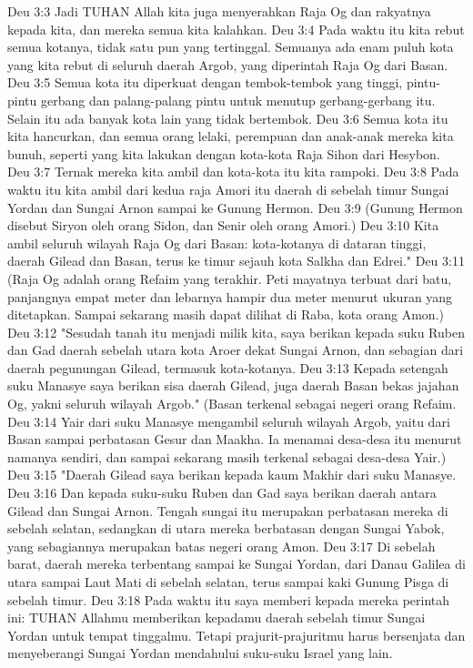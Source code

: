 Deu 3:3  Jadi TUHAN Allah kita juga menyerahkan Raja Og dan rakyatnya kepada kita, dan mereka semua kita kalahkan.
Deu 3:4  Pada waktu itu kita rebut semua kotanya, tidak satu pun yang tertinggal. Semuanya ada enam puluh kota yang kita rebut di seluruh daerah Argob, yang diperintah Raja Og dari Basan.
Deu 3:5  Semua kota itu diperkuat dengan tembok-tembok yang tinggi, pintu-pintu gerbang dan palang-palang pintu untuk menutup gerbang-gerbang itu. Selain itu ada banyak kota lain yang tidak bertembok.
Deu 3:6  Semua kota itu kita hancurkan, dan semua orang lelaki, perempuan dan anak-anak mereka kita bunuh, seperti yang kita lakukan dengan kota-kota Raja Sihon dari Hesybon.
Deu 3:7  Ternak mereka kita ambil dan kota-kota itu kita rampoki.
Deu 3:8  Pada waktu itu kita ambil dari kedua raja Amori itu daerah di sebelah timur Sungai Yordan dan Sungai Arnon sampai ke Gunung Hermon.
Deu 3:9  (Gunung Hermon disebut Siryon oleh orang Sidon, dan Senir oleh orang Amori.)
Deu 3:10  Kita ambil seluruh wilayah Raja Og dari Basan: kota-kotanya di dataran tinggi, daerah Gilead dan Basan, terus ke timur sejauh kota Salkha dan Edrei."
Deu 3:11  (Raja Og adalah orang Refaim yang terakhir. Peti mayatnya terbuat dari batu, panjangnya empat meter dan lebarnya hampir dua meter menurut ukuran yang ditetapkan. Sampai sekarang masih dapat dilihat di Raba, kota orang Amon.)
Deu 3:12  "Sesudah tanah itu menjadi milik kita, saya berikan kepada suku Ruben dan Gad daerah sebelah utara kota Aroer dekat Sungai Arnon, dan sebagian dari daerah pegunungan Gilead, termasuk kota-kotanya.
Deu 3:13  Kepada setengah suku Manasye saya berikan sisa daerah Gilead, juga daerah Basan bekas jajahan Og, yakni seluruh wilayah Argob." (Basan terkenal sebagai negeri orang Refaim.
Deu 3:14  Yair dari suku Manasye mengambil seluruh wilayah Argob, yaitu dari Basan sampai perbatasan Gesur dan Maakha. Ia menamai desa-desa itu menurut namanya sendiri, dan sampai sekarang masih terkenal sebagai desa-desa Yair.)
Deu 3:15  "Daerah Gilead saya berikan kepada kaum Makhir dari suku Manasye.
Deu 3:16  Dan kepada suku-suku Ruben dan Gad saya berikan daerah antara Gilead dan Sungai Arnon. Tengah sungai itu merupakan perbatasan mereka di sebelah selatan, sedangkan di utara mereka berbatasan dengan Sungai Yabok, yang sebagiannya merupakan batas negeri orang Amon.
Deu 3:17  Di sebelah barat, daerah mereka terbentang sampai ke Sungai Yordan, dari Danau Galilea di utara sampai Laut Mati di sebelah selatan, terus sampai kaki Gunung Pisga di sebelah timur.
Deu 3:18  Pada waktu itu saya memberi kepada mereka perintah ini: TUHAN Allahmu memberikan kepadamu daerah sebelah timur Sungai Yordan untuk tempat tinggalmu. Tetapi prajurit-prajuritmu harus bersenjata dan menyeberangi Sungai Yordan mendahului suku-suku Israel yang lain.
